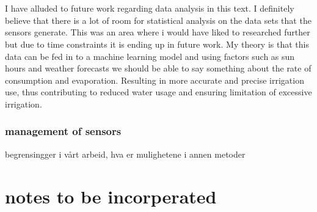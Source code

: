 \documentclass[]{uiophd}
\begin{document}
\\\\
I have alluded to future work regarding data analysis in this text. I definitely believe that there is a lot of room for statistical analysis on the data sets that the sensors generate. This was an area where i would have liked to researched further but due to time constraints it is ending up in future work. My theory is that this data can be fed in to a machine learning model and using factors such as sun hours and weather forecasts we should be able to say something about the rate of consumption and evaporation. Resulting in more accurate and precise irrigation use, thus contributing to reduced water usage and ensuring limitation of excessive irrigation.

\subsection{management of sensors}
begrensingger i vårt arbeid, hva er mulighetene i annen metoder

\chapter{notes to be incorperated}
\end{document}
